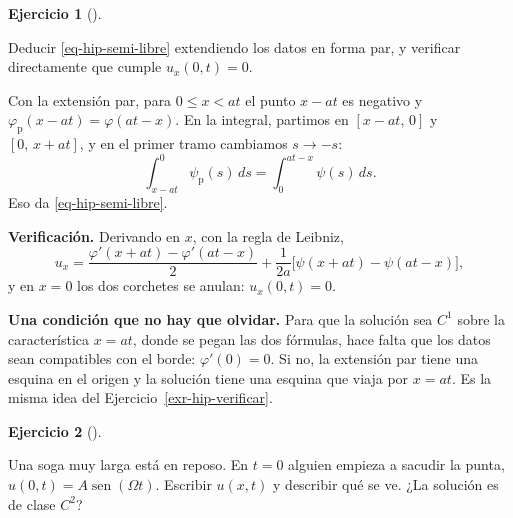 \documentclass[
  spanish,
  a4paper,
]{scrbook}
\theoremstyle{definition}
\theoremstyle{plain}
\theoremstyle{definition}
\theoremstyle{plain}
\theoremstyle{definition}
\newtheorem{exercise}{Ejercicio}[chapter]
\theoremstyle{remark}
\begin{document}
\begin{exercise}[]\protect\hypertarget{exr-hip-libre}{}\label{exr-hip-libre}

Deducir \ref{eq-hip-semi-libre} extendiendo los datos en forma par, y
verificar directamente que cumple \(u_x(0,t) = 0\).

\end{exercise}

\begin{tcolorbox}[enhanced jigsaw, arc=.35mm, bottomrule=.15mm, bottomtitle=1mm, breakable, colback=white, colbacktitle=quarto-callout-tip-color!10!white, colframe=quarto-callout-tip-color-frame, coltitle=black, left=2mm, leftrule=.75mm, opacityback=0, opacitybacktitle=0.6, rightrule=.15mm, title=\textcolor{quarto-callout-tip-color}{\faLightbulb}\hspace{0.5em}{Solución}, titlerule=0mm, toprule=.15mm, toptitle=1mm]

Con la extensión par, para \(0\le x<at\) el punto \(x-at\) es negativo y
\(\varphi_{\text{p}}(x-at) = \varphi(at-x)\). En la integral, partimos
en \([x-at,\,0]\) y \([0,\,x+at]\), y en el primer tramo cambiamos
\(s\to-s\): \[
\int_{x-at}^{0}\psi_{\text{p}}(s)\,ds = \int_{0}^{at-x}\psi(s)\,ds .
\] Eso da \ref{eq-hip-semi-libre}.

\textbf{Verificación.} Derivando en \(x\), con la regla de Leibniz, \[
u_x = \frac{\varphi'(x+at) - \varphi'(at-x)}{2} + \frac{1}{2a}\big[\psi(x+at) - \psi(at-x)\big],
\] y en \(x=0\) los dos corchetes se anulan: \(u_x(0,t) = 0\).

\textbf{Una condición que no hay que olvidar.} Para que la solución sea
\(C^1\) sobre la característica \(x = at\), donde se pegan las dos
fórmulas, hace falta que los datos sean compatibles con el borde:
\(\varphi'(0) = 0\). Si no, la extensión par tiene una esquina en el
origen y la solución tiene una esquina que viaja por \(x = at\). Es la
misma idea del Ejercicio~\ref{exr-hip-verificar}.

\end{tcolorbox}

\begin{exercise}[]\protect\hypertarget{exr-hip-soga}{}\label{exr-hip-soga}

Una soga muy larga está en reposo. En \(t=0\) alguien empieza a sacudir
la punta, \(u(0,t) = A\operatorname{sen}(\Omega t)\). Escribir
\(u(x,t)\) y describir qué se ve. ¿La solución es de clase \(C^2\)?

\end{exercise}
\end{document}

